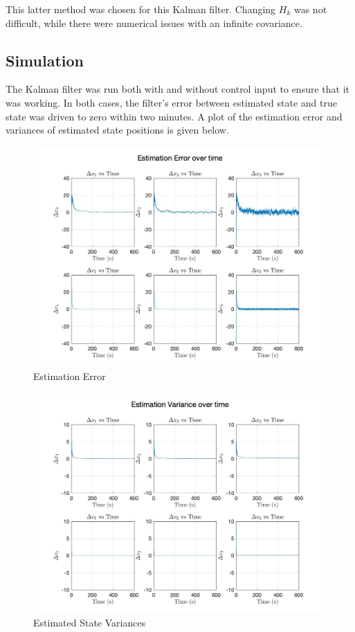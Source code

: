 \documentclass[12pt,onecolumn,reqno]{amsart}
\begin{document}
This latter method was chosen for this Kalman filter. Changing $H_k$ was not
difficult, while there were numerical issues with an infinite covariance.

\subsection{Simulation}
The Kalman filter was run both with and without control input to ensure that it
was working. In both cases, the filter's error between estimated state and true
state was driven to zero within two minutes. A plot of the estimation error and
variances of estimated state positions is given below. 

\begin{figure}[H]
	\includegraphics[width=\linewidth]{estimation_error_over_time.jpg}
	\caption{Estimation Error}
	\label{fig:Est. Error}
\end{figure}

\begin{figure}[H]
	\includegraphics[width=\linewidth]{estimation_variance_over_time.jpg}
	\caption{Estimated State Variances}
	\label{fig:Est. State Vars}
\end{figure}
\end{document}
